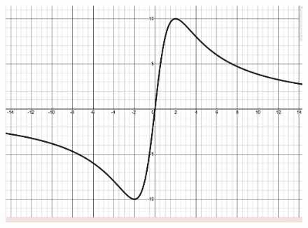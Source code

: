  \begin{figure}[h!]
 \centering
    \includegraphics[scale=0.20]{images/productQuotient/11_5a.png}
    \caption{}
    \end{figure}
    
